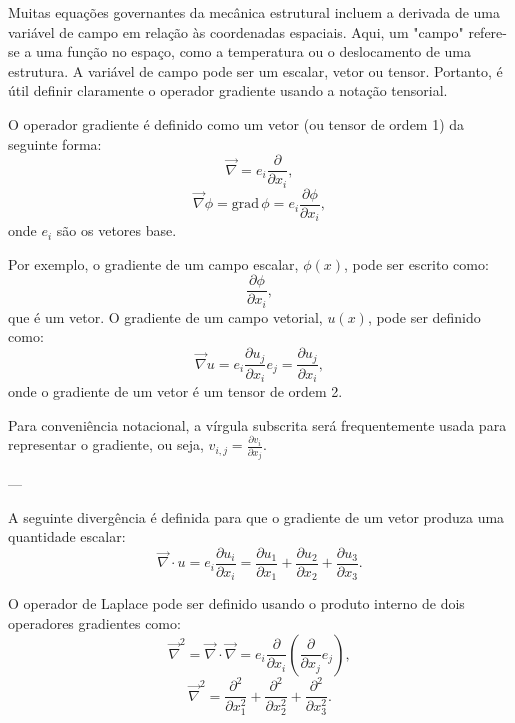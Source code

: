 {%
	Muitas equações governantes da mecânica estrutural incluem a derivada de uma variável de campo em relação às coordenadas espaciais. Aqui, um "campo" refere-se a uma função no espaço, como a temperatura ou o deslocamento de uma estrutura. A variável de campo pode ser um escalar, vetor ou tensor. Portanto, é útil definir claramente o operador gradiente usando a notação tensorial.
	
	O operador gradiente é definido como um vetor (ou tensor de ordem 1) da seguinte forma:
	\begin{equation}
		\vec{\nabla} = e_i \frac{\partial}{\partial x_i}, \tag{1.23}
	\end{equation}
	\begin{equation}
		\vec{\nabla} \phi = \text{grad} \, \phi = e_i \frac{\partial \phi}{\partial x_i}, \tag{1.24}
	\end{equation}
	onde $e_i$ são os vetores base.
	
	Por exemplo, o gradiente de um campo escalar, $\phi(x)$, pode ser escrito como:
	\begin{equation}
		\frac{\partial \phi}{\partial x_i},
	\end{equation}
	que é um vetor. O gradiente de um campo vetorial, $u(x)$, pode ser definido como:
	\begin{equation}
		\vec{\nabla} u = e_i \frac{\partial u_j}{\partial x_i} e_j = \frac{\partial u_j}{\partial x_i},
	\end{equation}
	onde o gradiente de um vetor é um tensor de ordem 2.
	
	Para conveniência notacional, a vírgula subscrita será frequentemente usada para representar o gradiente, ou seja, $v_{i,j} = \frac{\partial v_i}{\partial x_j}$.
	
	---
	
	A seguinte divergência é definida para que o gradiente de um vetor produza uma quantidade escalar:
	\begin{equation}
		\vec{\nabla} \cdot u = e_i \frac{\partial u_i}{\partial x_i} = \frac{\partial u_1}{\partial x_1} + \frac{\partial u_2}{\partial x_2} + \frac{\partial u_3}{\partial x_3}. \tag{1.25}
	\end{equation}
	
	O operador de Laplace pode ser definido usando o produto interno de dois operadores gradientes como:
	\begin{equation}
		\vec{\nabla}^2 = \vec{\nabla} \cdot \vec{\nabla} = e_i \frac{\partial}{\partial x_i} \left( \frac{\partial}{\partial x_j} e_j \right),
	\end{equation}
	\begin{equation}
		\vec{\nabla}^2 = \frac{\partial^2}{\partial x_1^2} + \frac{\partial^2}{\partial x_2^2} + \frac{\partial^2}{\partial x_3^2}. \tag{1.26}
	\end{equation}
	
}
